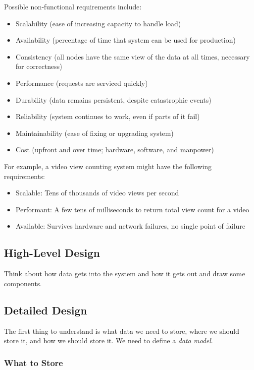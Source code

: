 \documentclass[12pt, titlepage]{article}
\begin{document}
Possible non-functional requirements include:
\begin{itemize}
  \item Scalability (ease of increasing capacity to handle load)
  \item Availability (percentage of time that system can be used for production)
  \item Consistency (all nodes have the same view of the data at all times, necessary for correctness)
  \item Performance (requests are serviced quickly)
  \item Durability (data remains persistent, despite catastrophic events)
  \item Reliability (system continues to work, even if parts of it fail)
  \item Maintainability (ease of fixing or upgrading system)
  \item Cost (upfront and over time; hardware, software, and manpower)
\end{itemize}

For example, a video view counting system might have the following requirements:
\begin{itemize}
  \item Scalable: Tens of thousands of video views per second
  \item Performant: A few tens of milliseconds to return total view count for a video
  \item Available: Survives hardware and network failures, no single point of failure
\end{itemize}

\subsection{High-Level Design}

Think about how data gets into the system and how it gets out and draw some components.

\subsection{Detailed Design}

The first thing to understand is what data we need to store, where we should store it, and how we should store it. We need to define a \textit{data model}.

\subsubsection{What to Store}
\end{document}
